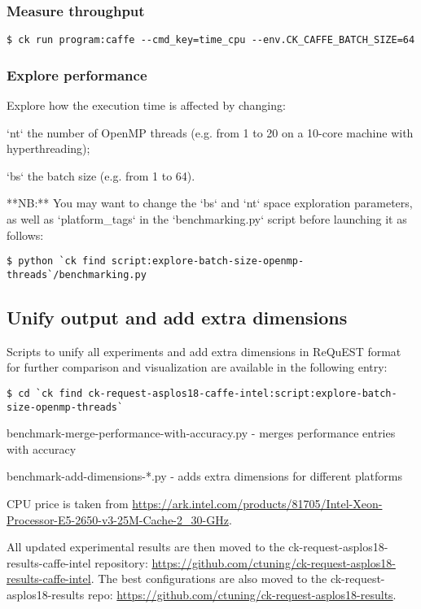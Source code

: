 \documentclass[sigplan]{acmart}
\newenvironment{packed_itemize}{
\begin{itemize}
  \setlength{\itemsep}{1pt}
  \setlength{\parskip}{0pt}
  \setlength{\parsep}{0pt}
}{\end{itemize}}
\begin{document}
\subsubsection{Measure throughput}
\begin{verbatim}
$ ck run program:caffe --cmd_key=time_cpu --env.CK_CAFFE_BATCH_SIZE=64
\end{verbatim}

\subsubsection{Explore performance}

Explore how the execution time is affected by changing:
\begin{packed_itemize}
 \item [`nt`] the number of OpenMP threads (e.g. from 1 to 20 on a 10-core machine with hyperthreading);
 \item [`bs`] the batch size (e.g. from 1 to 64).
\end{packed_itemize}

**NB:** You may want to change the `bs` and `nt` space exploration parameters, as well as
`platform\_tags` in the `benchmarking.py` script before launching it as follows:

\begin{verbatim}
$ python `ck find script:explore-batch-size-openmp-threads`/benchmarking.py
\end{verbatim}

\subsection{Unify output and add extra dimensions}

Scripts to unify all experiments and add extra dimensions in ReQuEST format for further comparison and visualization are available in the following entry:
\begin{verbatim}
$ cd `ck find ck-request-asplos18-caffe-intel:script:explore-batch-size-openmp-threads`
\end{verbatim}

\begin{packed_itemize}
 \item benchmark-merge-performance-with-accuracy.py - merges performance entries with accuracy
 \item benchmark-add-dimensions-*.py - adds extra dimensions for different platforms
\end{packed_itemize}

CPU price is taken from \url{https://ark.intel.com/products/81705/Intel-Xeon-Processor-E5-2650-v3-25M-Cache-2\_30-GHz}.

All updated experimental results are then moved to the ck-request-asplos18-results-caffe-intel repository: \url{https://github.com/ctuning/ck-request-asplos18-results-caffe-intel}.
The best configurations are also moved to the ck-request-asplos18-results repo: \url{https://github.com/ctuning/ck-request-asplos18-results}.
\end{document}
